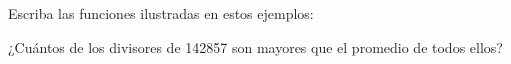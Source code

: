 Escriba las funciones ilustradas en estos ejemplos:



¿Cuántos de los divisores de 142857
son mayores que el promedio de todos ellos?
